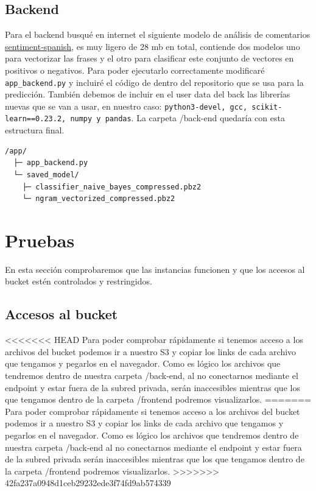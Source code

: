 \documentclass{article}
\begin{document}
	\subsection{Backend}

	Para el backend busqué en internet el siguiente modelo de análisis de comentarios \href{https://github.com/sentiment-analysis-spanish/sentiment-spanish}{sentiment-spanish}, es muy ligero de 28 mb en total, contiende dos modelos uno para vectorizar las frases y el otro para clasificar este conjunto de vectores en positivos o negativos. Para poder ejecutarlo correctamente modificaré \verb|app_backend.py| y incluiré el código de dentro del repositorio que se usa para la predicción. También debemos de incluir en el user data del back las librerías nuevas que se van a usar, en nuestro caso: \verb|python3-devel, gcc, scikit-learn==0.23.2, numpy y pandas|. La carpeta /back-end quedaría con esta estructura final.

	\begin{lstlisting}[style=consola, language=bash, caption={/back-end}]
 /app/
  ├─ app_backend.py
  └─ saved_model/
    ├─ classifier_naive_bayes_compressed.pbz2
    └─ ngram_vectorized_compressed.pbz2\end{lstlisting}


	\section{Pruebas}

	En esta sección comprobaremos que las instancias funcionen y que los accesos al bucket estén controlados y restringidos.

	\subsection{Accesos al bucket}

<<<<<<< HEAD
	Para poder comprobar rápidamente si tenemos acceso a los archivos del bucket podemos ir a nuestro S3 y copiar los links de cada archivo que tengamos y pegarlos en el navegador. Como es lógico los archivos que tendremos dentro de nuestra carpeta /back-end, al no conectarnos mediante el endpoint y estar fuera de la subred privada, serán inaccesibles mientras que los que tengamos dentro de la carpeta /frontend podremos visualizarlos.
=======
	Para poder comprobar rápidamente si tenemos acceso a los archivos del bucket podemos ir a nuestro S3 y copiar los links de cada archivo que tengamos y pegarlos en el navegador. Como es lógico los archivos que tendremos dentro de nuestra carpeta /back-end al no conectarnos mediante el endpoint y estar fuera de la subred privada serán inaccesibles mientras que los que tengamos dentro de la carpeta /frontend podremos visualizarlos.
>>>>>>> 42fa237a0948d1ceb29232ede3f74fd9ab574339
\end{document}
